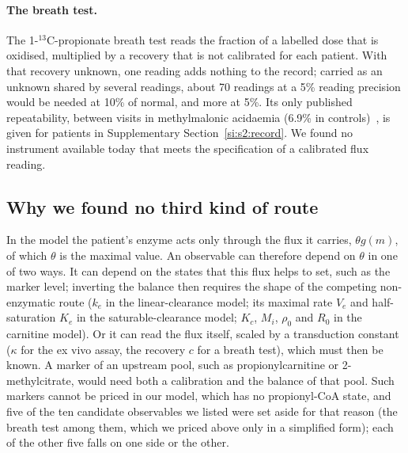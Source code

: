 \paragraph{The breath test.} The 1-$^{13}$C-propionate breath test reads the fraction of a
labelled dose that is oxidised, multiplied by a recovery that is not calibrated for each
patient. With that recovery unknown, one reading adds nothing to the record; carried as an
unknown shared by several readings, about 70 readings at a 5\% reading precision would be
needed at 10\% of normal, and more at 5\%. Its only published repeatability, between visits in
methylmalonic acidaemia (6.9\% in controls)~\cite{breath_test_mma}, is given for patients in
Supplementary Section~\ref{si:s2:record}. We found no instrument available today that meets the
specification of a calibrated flux reading.

\subsection{Why we found no third kind of route}
\label{si:s4:third}

In the model the patient's enzyme acts only through the flux it carries, $\theta g(m)$, of which
$\theta$ is the maximal value. An observable can therefore depend on $\theta$ in one of two ways.
It can depend on the states that this flux helps to set, such as the marker level; inverting the
balance then requires the shape of the competing non-enzymatic route ($k_e$ in the
linear-clearance model; its maximal rate $V_e$ and half-saturation $K_e$ in the
saturable-clearance model; $K_c$, $M_i$, $\rho_0$ and $R_0$ in the carnitine model). Or it can
read the flux itself, scaled by a transduction constant ($\kappa$ for the ex vivo assay, the
recovery $c$ for a breath test), which must then be known. A marker of an upstream pool, such as
propionylcarnitine or 2-methylcitrate, would need both a calibration and the balance of that
pool. Such markers cannot be priced in our model, which has no propionyl-CoA state, and five of
the ten candidate observables we listed were set aside for that reason (the breath test among
them, which we priced above only in a simplified form); each of the other five falls on one side
or the other.

